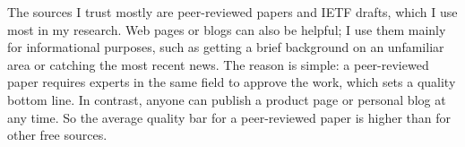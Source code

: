 \documentclass[11pt]{article}
\begin{document}
The sources I trust mostly are peer-reviewed papers and IETF drafts, which I use most in my research. Web pages or blogs can also be helpful; I use them mainly for informational purposes, such as getting a brief background on an unfamiliar area or catching the most recent news. The reason is simple: a peer-reviewed paper requires experts in the same field to approve the work, which sets a quality bottom line. In contrast, anyone can publish a product page or personal blog at any time. So the average quality bar for a peer-reviewed paper is higher than for other free sources.




\end{document}
